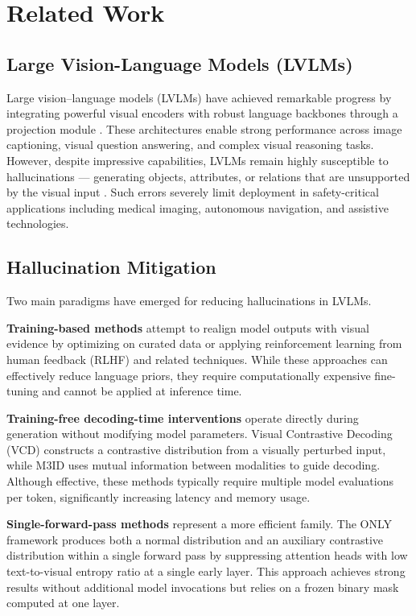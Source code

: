 \section{Related Work}
\label{sec:related}

\subsection{Large Vision-Language Models (LVLMs)}
Large vision--language models (LVLMs) have achieved remarkable progress by integrating powerful visual encoders with robust language backbones through a projection module \cite{liu2024visual, alayrac2022flamingo, li2023blip2}. These architectures enable strong performance across image captioning, visual question answering, and complex visual reasoning tasks. However, despite impressive capabilities, LVLMs remain highly susceptible to hallucinations — generating objects, attributes, or relations that are unsupported by the visual input \cite{rohrbach2018object, li2023pope}. Such errors severely limit deployment in safety-critical applications including medical imaging, autonomous navigation, and assistive technologies.

\subsection{Hallucination Mitigation}
Two main paradigms have emerged for reducing hallucinations in LVLMs.

\textbf{Training-based methods} attempt to realign model outputs with visual evidence by optimizing on curated data or applying reinforcement learning from human feedback (RLHF) and related techniques. While these approaches can effectively reduce language priors, they require computationally expensive fine-tuning and cannot be applied at inference time.

\textbf{Training-free decoding-time interventions} operate directly during generation without modifying model parameters. Visual Contrastive Decoding (VCD) \cite{leng2024mitigating} constructs a contrastive distribution from a visually perturbed input, while M3ID \cite{fayyaz2024m3id} uses mutual information between modalities to guide decoding. Although effective, these methods typically require multiple model evaluations per token, significantly increasing latency and memory usage.

\textbf{Single-forward-pass methods} represent a more efficient family. The ONLY framework \cite{wan2025only} produces both a normal distribution and an auxiliary contrastive distribution within a single forward pass by suppressing attention heads with low text-to-visual entropy ratio at a single early layer. This approach achieves strong results without additional model invocations but relies on a frozen binary mask computed at one layer.

